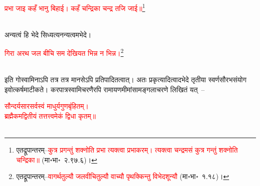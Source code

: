 \centering\textcolor{red}{प्रभा जाइ कहँ भानु बिहाई। कहँ चन्द्रिका चन्द्र तजि जाई॥}\footnote{एतद्रूपान्तरम्–\textcolor{red}{कुत्र प्रगन्तुं शक्नोति प्रभा त्यक्त्वा प्रभाकरम्। त्यक्त्वा चन्द्रमसं कुत्र गन्तुं शक्नोति चन्द्रिका॥} (मा॰भा॰~२.९७.६)।}\nopagebreak\\
\\
\begin{sloppypar}\justifying\noindent अन्यत्वं हि भेदे सिध्यत्यनन्यत्वमभेदे।\end{sloppypar}
\centering\textcolor{red}{गिरा अरथ जल बीचि सम देखियत भिन्न न भिन्न।}\footnote{एतद्रूपान्तरम्–\textcolor{red}{वागर्थतुल्यौ जलवीचितुल्यौ वाच्यौ पृथक्किन्तु विभेदशून्यौ} (मा॰भा॰~१.१८)।}\nopagebreak\\
\\
\begin{sloppypar}\justifying\noindent इति गोस्वामिनाऽपि तत्र तत्र मानसेऽपि प्रतिपादितत्वात्। अतः प्रकृत्यादित्वादभेदे तृतीया स्वर्ण\-सौरभ\-संयोग इवोत्कर्षमाटीकते। करपात्र\-स्वामि\-चरणैरपि रामायण\-मीमांसा\-मङ्गलाचरणे लिखितं यत्~–\end{sloppypar}
\centering\textcolor{red}{सौन्दर्यसारसर्वस्वं माधुर्यगुणबृंहितम्।\nopagebreak\\
ब्रह्मैकमद्वितीयं तत्तत्त्वमेकं द्विधा कृतम्॥}\nopagebreak\\
\\
